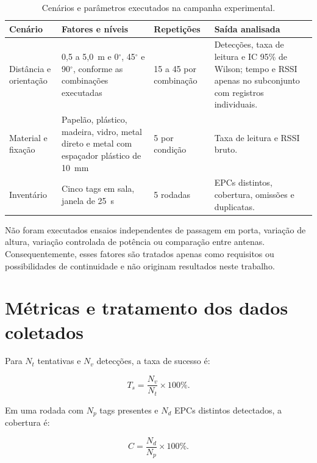\begin{table}[htbp]
    \centering
    \caption{Cenários e parâmetros executados na campanha experimental.}
    \label{tab:plano-ensaios}
    \footnotesize
    \begin{tabularx}{\textwidth}{p{3.2cm}p{4.2cm}p{3.0cm}X}
        \toprule
        \textbf{Cenário} & \textbf{Fatores e níveis} & \textbf{Repetições} & \textbf{Saída analisada} \\
        \midrule
        Distância e orientação & 0,5 a 5,0~m e 0$^\circ$, 45$^\circ$ e 90$^\circ$, conforme as combinações executadas & 15 a 45 por combinação & Detecções, taxa de leitura e IC 95\% de Wilson; tempo e RSSI apenas no subconjunto com registros individuais. \\
        Material e fixação & Papelão, plástico, madeira, vidro, metal direto e metal com espaçador plástico de 10~mm & 5 por condição & Taxa de leitura e RSSI bruto. \\
        Inventário & Cinco tags em sala, janela de 25~s & 5 rodadas & EPCs distintos, cobertura, omissões e duplicatas. \\
        \bottomrule
    \end{tabularx}
\end{table}

\FloatBarrier

Não foram executados ensaios independentes de passagem em porta, variação de altura, variação controlada de potência ou comparação entre antenas. Consequentemente, esses fatores são tratados apenas como requisitos ou possibilidades de continuidade e não originam resultados neste trabalho.

\section{Métricas e tratamento dos dados coletados}

Para $N_t$ tentativas e $N_v$ detecções, a taxa de sucesso é:

\begin{equation}
    T_s = \frac{N_v}{N_t}\times 100\%.
    \label{eq:taxa-sucesso}
\end{equation}

Em uma rodada com $N_p$ tags presentes e $N_d$ EPCs distintos detectados, a cobertura é:

\begin{equation}
    C = \frac{N_d}{N_p}\times 100\%.
    \label{eq:cobertura}
\end{equation}

